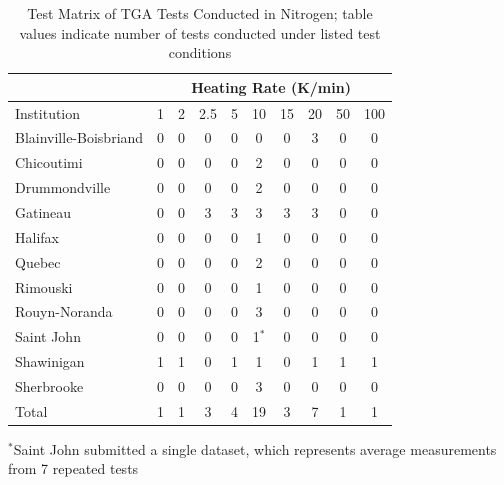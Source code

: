 \documentclass{book}
\begin{document}
\begin{table}[ht]
\caption{Test Matrix of TGA Tests Conducted in Nitrogen; table values indicate number of tests conducted under listed test conditions}
\label{Table_3}
\begin{center}
\begin{tabular}{lccccccccc}
                        & \multicolumn{9}{c}{Heating Rate (K/min)}                     \\ \hline
Institution             & 1     & 2   & 2.5 & 5   & 10    & 15  & 20  & 50  & 100      \\ \hline
Blainville-Boisbriand   &   0   & 0   & 0   & 0   & 0     & 0   & 3   & 0   & 0        \\
Chicoutimi              &   0   & 0   & 0   & 0   & 2     & 0   & 0   & 0   & 0        \\
Drummondville           &   0   & 0   & 0   & 0   & 2     & 0   & 0   & 0   & 0        \\
Gatineau                &   0   & 0   & 3   & 3   & 3     & 3   & 3   & 0   & 0        \\
Halifax                 &   0   & 0   & 0   & 0   & 1     & 0   & 0   & 0   & 0        \\
Quebec                  &   0   & 0   & 0   & 0   & 2     & 0   & 0   & 0   & 0        \\
Rimouski                &   0   & 0   & 0   & 0   & 1     & 0   & 0   & 0   & 0        \\
Rouyn-Noranda           &   0   & 0   & 0   & 0   & 3     & 0   & 0   & 0   & 0        \\
Saint John              &   0   & 0   & 0   & 0   & 1$^*$ & 0   & 0   & 0   & 0        \\
Shawinigan              &   1   & 1   & 0   & 1   & 1     & 0   & 1   & 1   & 1        \\
Sherbrooke              &   0   & 0   & 0   & 0   & 3     & 0   & 0   & 0   & 0        \\ \hline
Total                   &   1   & 1   & 3   & 4   & 19    & 3   & 7   & 1   & 1        \\ \hline
\end{tabular}
\end{center}
$^*$Saint John submitted a single dataset, which represents average measurements from 7 repeated tests
\end{table}
\end{document}
